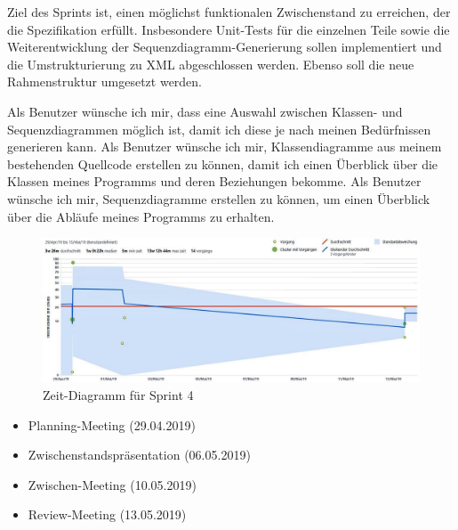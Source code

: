 Ziel des Sprints ist, einen möglichst funktionalen Zwischenstand zu erreichen, der die Spezifikation erfüllt. Insbesondere Unit-Tests für die einzelnen Teile sowie die Weiterentwicklung der Sequenzdiagramm-Generierung sollen implementiert und die Umstrukturierung zu XML  abgeschlossen werden.
Ebenso soll die neue Rahmenstruktur umgesetzt werden.

\nsecend

Als Benutzer wünsche ich mir, dass eine Auswahl zwischen Klassen- und Sequenzdiagrammen möglich ist, damit ich diese je nach meinen Bedürfnissen generieren kann.
\nsecend
{}
Als Benutzer wünsche ich mir, Klassendiagramme aus meinem bestehenden Quellcode erstellen zu können, damit ich einen Überblick über die Klassen meines Programms und deren Beziehungen bekomme.
\nsecend
{}
Als Benutzer wünsche ich mir, Sequenzdiagramme erstellen zu können, um einen Überblick über die Abläufe meines Programms zu erhalten.
\nsecend
\nsecend%
\nsecend %

\begin{figure}[hbtp]
\centering
\includegraphics[width=\textwidth]{Bilder/ZeitSprint4}
\caption{Zeit-Diagramm für Sprint 4}
\end{figure}
\nsecend%

\begin{itemize}
\item Planning-Meeting (29.04.2019)
\item Zwischenstandspräsentation (06.05.2019)
\item Zwischen-Meeting (10.05.2019)
\item Review-Meeting (13.05.2019)
\end{itemize}
\nsecend%

